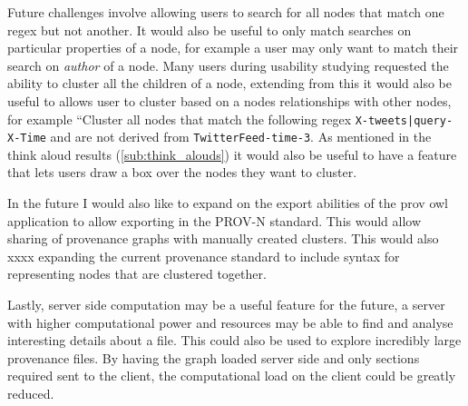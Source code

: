 Future challenges involve allowing users to search for all nodes that match one regex but not another. It would also be useful to only match searches on particular properties of a node, for example a user may only want to match their search on \textit{author} of a node. Many users during usability studying requested the ability to cluster all the children of a node, extending from this it would also be useful to allows user to cluster based on a nodes relationships with other nodes, for example ``Cluster all nodes that match the following regex \texttt{X-tweets|query-X-Time} and are not derived from \texttt{TwitterFeed-time-3}. As mentioned in the think aloud results (\ref{sub:think_alouds}) it would also be useful to have a feature that lets users draw a box over the nodes they want to cluster.

In the future I would also like to expand on the export abilities of the prov owl application to allow exporting in the PROV-N standard. This would allow sharing of provenance graphs with manually created clusters. This would also xxxx expanding the current provenance standard to include syntax for representing nodes that are clustered together.

Lastly, server side computation may be a useful feature for the future, a server with higher computational power and resources may be able to find and analyse interesting details about a file. This could also be used to explore incredibly large provenance files. By having the graph loaded server side and only sections required sent to the client, the computational load on the client could be greatly reduced.
